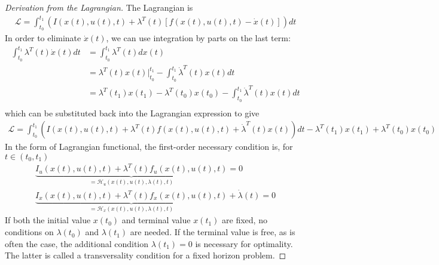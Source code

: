 \documentclass[11pt]{elegantbook}
\begin{document}
\begin{proof}[Derivation from the Lagrangian]
    The Lagrangian is
    \begin{equation}
        \begin{aligned}
            \mathcal{L}=\int_{t_0}^{t_1}\left(I(x(t),u(t),t)+\lambda^T(t)\left[f(x(t),u(t),t)-\dot{x}(t)\right]\right)dt
        \end{aligned}
        \nonumber
    \end{equation}
    In order to eliminate $\dot{x}(t)$, we can use integration by parts on the last term:
    \begin{equation}
        \begin{aligned}
            \int_{t_0}^{t_1}\lambda^T(t)\dot{x}(t)dt&=\int_{t_0}^{t_1}\lambda^T(t)dx(t)\\
            &=\lambda^T(t)x(t)\big|_{t_0}^{t_1}-\int_{t_0}^{t_1}\dot{\lambda}^T(t)x(t)dt\\
            &=\lambda^T(t_1)x(t_1)-\lambda^T(t_0)x(t_0)-\int_{t_0}^{t_1}\dot{\lambda}^T(t)x(t)dt\\
        \end{aligned}
        \nonumber
    \end{equation}
    which can be substituted back into the Lagrangian expression to give
    \begin{equation}
        \begin{aligned}
            \mathcal{L}=\int_{t_0}^{t_1}\left(I(x(t),u(t),t)+\lambda^T(t)f(x(t),u(t),t)+\dot{\lambda}^T(t)x(t)\right)dt-\lambda^T(t_1)x(t_1)+\lambda^T(t_0)x(t_0)
        \end{aligned}
        \nonumber
    \end{equation}
    In the form of Lagrangian functional, the first-order necessary condition is, for $t\in(t_0,t_1)$
    \begin{equation}
        \begin{aligned}
            \underbrace{I_u(x(t),u(t),t)+\lambda^T(t)f_u(x(t),u(t),t)}_{=\mathcal{H}_u(x(t),u(t),\lambda(t),t)}=0\\
            \underbrace{I_x(x(t),u(t),t)+\lambda^T(t)f_x(x(t),u(t),t)}_{=\mathcal{H}_x(x(t),u(t),\lambda(t),t)}+\dot{\lambda}(t)=0
        \end{aligned}
        \nonumber
    \end{equation}
    If both the initial value $x(t_0)$ and terminal value $x(t_1)$ are fixed, no conditions on $\lambda(t_0)$ and $\lambda(t_1)$ are needed. If the terminal value is free, as is often the case, the additional condition $\lambda(t_1)=0$ is necessary for optimality. The latter is called a transversality condition for a fixed horizon problem.
\end{proof}
\end{document}
